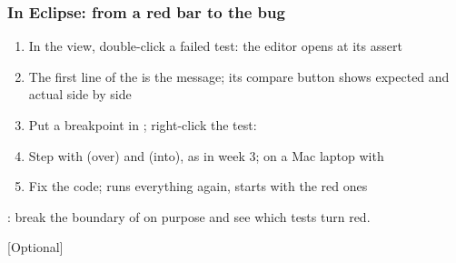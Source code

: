 \documentclass[aspectratio=169,10pt,compress]{beamer}
\newif\ifAdvanced    \Advancedtrue     %
\begin{document}
\begin{frame}[t,fragile] \frametitle{In Eclipse: from a red bar to the bug}
	\begin{enumerate}\small
		\item In the  view, double-click a failed test: the editor opens at its assert
		\item The first line of the  is the message; its compare button shows expected and actual side by side
		\item Put a breakpoint in ; right-click the test: 
		\item Step with  (over) and  (into), as in week 3; on a Mac laptop with 
		\item Fix the code;  runs everything again,  starts with the red ones
	\end{enumerate}

	\vspace{0.5em}
	\small {}: break the boundary of  on purpose and see which tests turn red.
\end{frame}



\fi %



\ifAdvanced %




[\small Optional]
\end{document}
